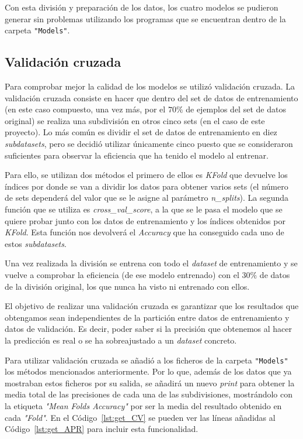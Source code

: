 \documentclass[a4paper, 12pt]{book}
\begin{document}
Con esta división y preparación de los datos, los cuatro modelos se pudieron generar sin problemas utilizando los programas que se encuentran dentro de la carpeta \texttt{"Models"}. 


\subsection{Validación cruzada}

Para comprobar mejor la calidad de los modelos se utilizó validación cruzada. La validación cruzada consiste en hacer que dentro del set de datos de entrenamiento (en este caso compuesto, una vez más, por el $70\%$ de ejemplos del set de datos original) se realiza una subdivisión en otros cinco sets (en el caso de este proyecto). Lo más común es dividir el set de datos de entrenamiento en diez \textit{subdatasets}, pero se decidió utilizar únicamente cinco puesto que se consideraron suficientes para observar la eficiencia que ha tenido el modelo al entrenar. 

Para ello, se utilizan dos métodos el primero de ellos es \textit{KFold} que devuelve los índices por donde se van a dividir los datos para obtener varios sets (el número de sets dependerá del valor que se le asigne al parámetro \textit{n\_splits}). La segunda función que se utiliza es \textit{cross\_val\_score}, a la que se le pasa el modelo que se quiere probar junto con los datos de entrenamiento y los índices obtenidos por \textit{KFold}. Esta función nos devolverá el \textit{Accuracy} que ha conseguido cada uno de estos \textit{subdatasets}.

Una vez realizada la división se entrena con todo el \textit{dataset} de entrenamiento y se vuelve a comprobar la eficiencia (de ese modelo entrenado) con el $30\%$ de datos de la división original, los que nunca ha visto ni entrenado con ellos.

El objetivo de realizar una validación cruzada es garantizar que los resultados que obtengamos sean independientes de la partición entre datos de entrenamiento y datos de validación. Es decir, poder saber si la precisión que obtenemos al hacer la predicción es real o se ha sobreajustado a un \textit{dataset} concreto.
 
 Para utilizar validación cruzada se añadió a los ficheros de la carpeta \texttt{"Models"} los métodos mencionados anteriormente. Por lo que, además de los datos que ya mostraban estos ficheros por su salida, se añadirá un nuevo \textit{print} para obtener la media total de las precisiones de cada una de las subdivisiones, mostrándolo con la etiqueta \textit{"Mean Folds Accuracy"} por ser la media del resultado obtenido en cada \textit{"Fold"}. En el Código~\ref{lst:get_CV} se pueden ver las líneas añadidas al Código~\ref{lst:get_APR} para incluir esta funcionalidad.
 
\end{document}
